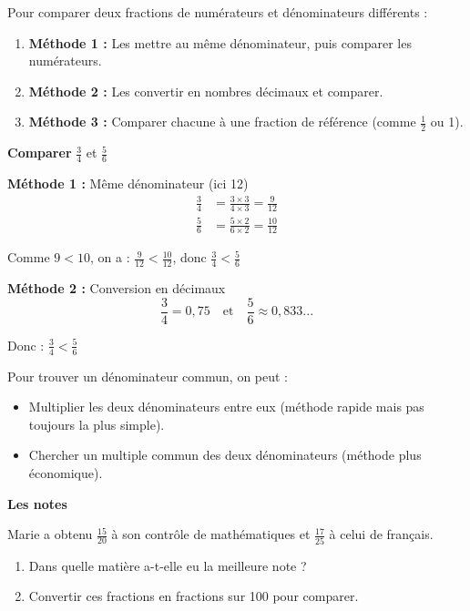 \begin{methodebox}
	Pour comparer deux fractions de numérateurs et dénominateurs différents :
	\begin{enumerate}
		\item \textbf{Méthode 1 :} Les mettre au même dénominateur, puis comparer les numérateurs.
		\item \textbf{Méthode 2 :} Les convertir en nombres décimaux et comparer.
		\item \textbf{Méthode 3 :} Comparer chacune à une fraction de référence (comme $\frac{1}{2}$ ou 1).
	\end{enumerate}
\end{methodebox}

\begin{examplebox}
	\textbf{Comparer} $\frac{3}{4}$ et $\frac{5}{6}$
	
	\textbf{Méthode 1 :} Même dénominateur (ici 12)
	\begin{align*}
		\frac{3}{4} &= \frac{3 \times 3}{4 \times 3} = \frac{9}{12}\\
		\frac{5}{6} &= \frac{5 \times 2}{6 \times 2} = \frac{10}{12}
	\end{align*}
	
	Comme $9 < 10$, on a : $\frac{9}{12} < \frac{10}{12}$, donc $\frac{3}{4} < \frac{5}{6}$
	
	\medskip
	
	\textbf{Méthode 2 :} Conversion en décimaux
	$$\frac{3}{4} = 0,75 \quad \text{et} \quad \frac{5}{6} \approx 0,833...$$
	
	Donc : $\frac{3}{4} < \frac{5}{6}$
\end{examplebox}

\begin{astucebox}
	Pour trouver un dénominateur commun, on peut :
	\begin{itemize}
		\item Multiplier les deux dénominateurs entre eux (méthode rapide mais pas toujours la plus simple).
		\item Chercher un multiple commun des deux dénominateurs (méthode plus économique).
	\end{itemize}
\end{astucebox}

\begin{applicationbox}
	\textbf{Les notes}
	
	Marie a obtenu $\frac{15}{20}$ à son contrôle de mathématiques et $\frac{17}{25}$ à celui de français.
	
	\begin{enumerate}[label=\alph*)]
		\item Dans quelle matière a-t-elle eu la meilleure note ?
		\item Convertir ces fractions en fractions sur 100 pour comparer.
	\end{enumerate}
\end{applicationbox}

